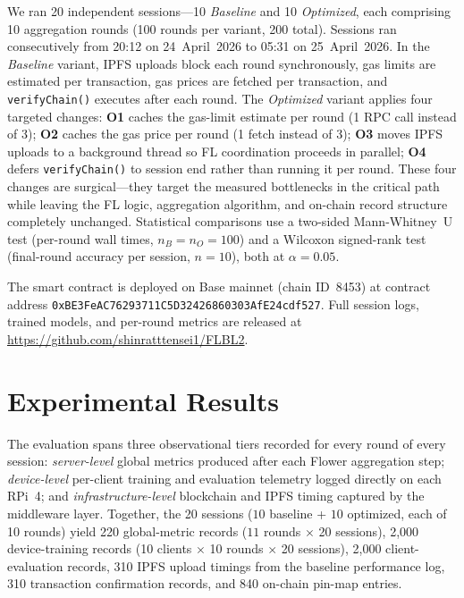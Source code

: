 \documentclass{llncs}
\begin{document}
We ran 20 independent sessions---10 \emph{Baseline} and 10 \emph{Optimized},
each comprising 10 aggregation rounds (100 rounds per variant, 200 total).
Sessions ran consecutively from 20:12 on 24~April~2026 to 05:31 on
25~April~2026. In the \emph{Baseline} variant, IPFS uploads block each round
synchronously, gas limits are estimated per transaction, gas prices are
fetched per transaction, and \texttt{verifyChain()} executes after each round.
The \emph{Optimized} variant applies four targeted changes: \textbf{O1}
caches the gas-limit estimate per round (1 RPC call instead of 3);
\textbf{O2} caches the gas price per round (1 fetch instead of 3);
\textbf{O3} moves IPFS uploads to a background thread so FL coordination
proceeds in parallel; \textbf{O4} defers \texttt{verifyChain()} to session
end rather than running it per round. These four changes are surgical---they
target the measured bottlenecks in the critical path while leaving the FL
logic, aggregation algorithm, and on-chain record structure completely
unchanged. Statistical comparisons use a two-sided Mann-Whitney~U test
(per-round wall times, $n_B = n_O = 100$) and a Wilcoxon signed-rank test
(final-round accuracy per session, $n=10$), both at $\alpha=0.05$.

{\sloppy\noindent%
The smart contract is deployed on Base mainnet (chain ID~8453) at
contract address
\texttt{0xBE3FeA\allowbreak C76293711\allowbreak C5D32426\allowbreak 860303Af\allowbreak E24cdf527}.
Full session logs, trained models, and per-round metrics are released
at \url{https://github.com/shinratttensei1/FLBL2}.\par}


\FloatBarrier
\section{Experimental Results}
\label{sec:results}

The evaluation spans three observational tiers recorded for every round of
every session: \textit{server-level} global metrics produced after each
Flower aggregation step; \textit{device-level} per-client training and
evaluation telemetry logged directly on each RPi~4; and
\textit{infrastructure-level} blockchain and IPFS timing captured by the
middleware layer. Together, the 20 sessions ($10$ baseline + $10$ optimized,
each of 10 rounds) yield 220 global-metric records ($11$ rounds $\times$ 20
sessions), 2{,}000 device-training records (10 clients $\times$ 10 rounds
$\times$ 20 sessions), 2{,}000 client-evaluation records, 310 IPFS upload
timings from the baseline performance log, 310 transaction confirmation
records, and 840 on-chain pin-map entries.
\end{document}
